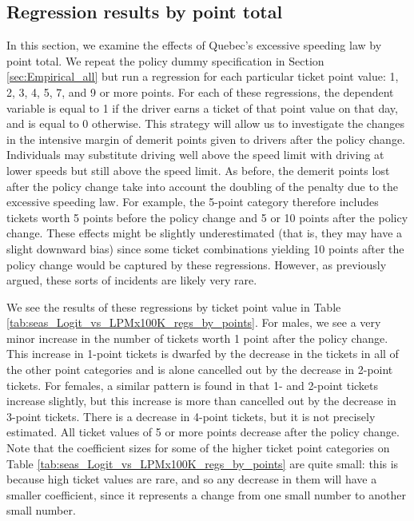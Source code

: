 \subsection{Regression results by point total}
\label{sec:Empirical_by_pts}

In this section, we examine the effects of Quebec’s excessive speeding law by point total. 
We repeat the policy dummy specification in 
Section \ref{sec:Empirical_all} 
but run a regression for each particular ticket point value: 1, 2, 3, 4, 5, 7, and 9 or more points. 
For each of these regressions, the dependent variable is equal to 1 
if the driver earns a ticket of that point value on that day, and is equal to 0 otherwise. 
This strategy will allow us to investigate the changes in the intensive margin of 
demerit points given to drivers after the policy change. 
Individuals may substitute driving well above the speed limit with driving at lower speeds 
but still above the speed limit. 
As before, the demerit points lost after the policy change take into account 
the doubling of the penalty due to the excessive speeding law. 
For example, the 5-point category therefore includes tickets 
worth 5 points before the policy change and 5 or 10 points after the policy change. 
These effects might be slightly underestimated (that is, they may have a slight downward bias) 
since some ticket combinations yielding 10 points after the policy change 
would be captured by these regressions. 
However, as previously argued, these sorts of incidents are likely very rare. 





We see the results of these regressions by ticket point value in 
Table \ref{tab:seas_Logit_vs_LPMx100K_regs_by_points}. 
For males, we see a very minor increase in the number of tickets 
worth 1 point after the policy change. 
This increase in 1-point tickets is dwarfed by the decrease in the tickets 
in all of the other point categories and is alone cancelled out 
by the decrease in 2-point tickets. 
For females, a similar pattern is found in that 1- and 2-point tickets increase slightly,
but this increase is more than cancelled out by the decrease in 3-point tickets. 
There is a decrease in 4-point tickets, but it is not precisely estimated. 
All ticket values of 5 or more points decrease after the policy change. 
Note that the coefficient sizes for some of the higher ticket point categories on 
Table \ref{tab:seas_Logit_vs_LPMx100K_regs_by_points}
are quite small: 
this is because high ticket values are rare, 
and so any decrease in them will have a smaller coefficient, 
since it represents a change from one small number to another small number.

